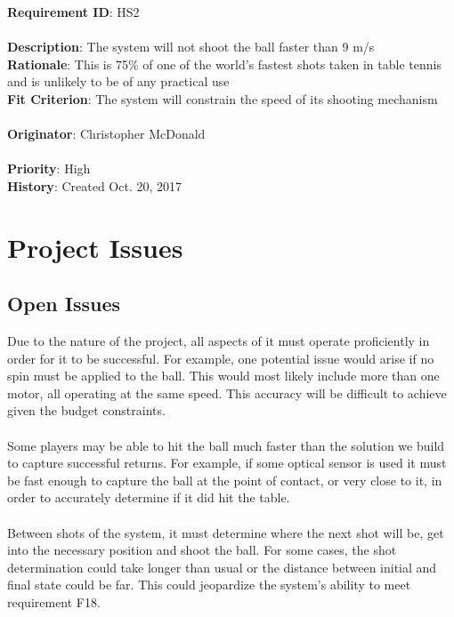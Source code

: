 \documentclass[11pt]{article}
\begin{document}
\begin{framed}
	\noindent\textbf{Requirement ID}: HS2 \hfill\\\\
	\noindent\textbf{Description}: The system will not shoot the ball faster than 9 m/s \\
	\textbf{Rationale}: This is 75\% of one of the world's fastest shots taken in table tennis and is unlikely to be of any practical use\\
	\textbf{Fit Criterion}: The system will constrain the speed of its shooting mechanism \\\\
	\textbf{Originator}: Christopher McDonald \\\\
	\textbf{Priority}: High \hfill \\
	\noindent\textbf{History}: Created Oct. 20, 2017
\end{framed}

\section{Project Issues}
\subsection{Open Issues}
Due to the nature of the project, all aspects of it must operate proficiently in order for it to be successful. For example, one potential issue would arise if no spin must be applied to the ball. This would most likely include more than one motor, all operating at the same speed. This accuracy will be difficult to achieve given the budget constraints. \\\\
Some players may be able to hit the ball much faster than the solution we build to capture successful returns. For example, if some optical sensor is used it must be fast enough to capture the ball at the point of contact, or very close to it, in order to accurately determine if it did hit the table. \\\\
Between shots of the system, it must determine where the next shot will be, get into the necessary position and shoot the ball. For some cases, the shot determination could take longer than usual or the distance between initial and final state could be far. This could jeopardize the system's ability to meet requirement F18.
\end{document}
